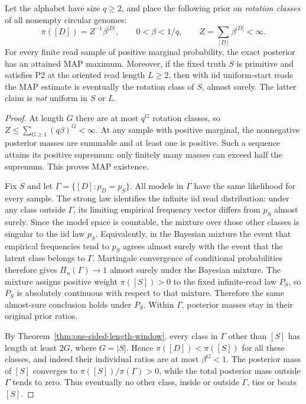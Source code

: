 \begin{proposition}
\label{prop:length-prior-map}
Let the alphabet have size $q\ge2$, and place the
following prior on \emph{rotation classes} of all nonempty
circular genomes:
\[
  \pi([D])=Z^{-1}\beta^{|D|},
  \qquad 0<\beta<1/q,\qquad
  Z=\sum_{[D]}\beta^{|D|}<\infty.
\]
For every finite read sample of positive marginal
probability, the exact posterior has an attained MAP
maximum. Moreover, if the fixed truth $S$ is primitive
and satisfies P2 at the oriented read length $L\ge2$,
then with iid uniform-start reads the MAP estimate is
eventually the rotation class of $S$, almost surely.
The latter claim is \emph{not} uniform in $S$ or $L$.
\end{proposition}
\begin{proof}
At length $G$ there are at most $q^G$ rotation classes,
so $Z\le\sum_{G\ge1}(q\beta)^G<\infty$.
At any sample with positive marginal, the nonnegative
posterior masses are summable and at least one is
positive. Such a sequence attains its positive
supremum: only finitely many masses can exceed
half the supremum. This proves MAP existence.

Fix $S$ and let $\Gamma=\{[D]:p_D=p_S\}$. All
models in $\Gamma$ have the same likelihood for
every sample. The strong law identifies the infinite
iid read distribution: under any class outside $\Gamma$,
its limiting empirical frequency vector differs
from $p_S$ almost surely. Since the model space is
countable, the mixture over those other classes
is singular to the iid law $p_S$. Equivalently, in
the Bayesian mixture the event
that empirical frequencies tend to $p_S$ agrees
almost surely with the event that the latent class
belongs to $\Gamma$. Martingale convergence of
conditional probabilities therefore gives
$\Pi_n(\Gamma)\to1$ almost surely under the Bayesian
mixture. The mixture assigns positive weight $\pi([S])>0$
to the fixed infinite-read law $P_S$, so $P_S$ is
absolutely continuous with respect to that mixture.
Therefore the same almost-sure conclusion holds under $P_S$.
Within $\Gamma$, posterior masses stay in their
original prior ratios.

By Theorem~\ref{thm:one-sided-length-window}, every
class in $\Gamma$ other than $[S]$ has length at
least $2G$, where $G=|S|$. Hence
$\pi([D])<\pi([S])$ for all these classes,
and indeed their individual ratios are at most
$\beta^G<1$. The posterior mass of $[S]$
converges to $\pi([S])/\pi(\Gamma)>0$, while
the total posterior mass outside $\Gamma$ tends
to zero. Thus eventually no other class, inside
or outside $\Gamma$, ties or beats $[S]$.
\end{proof}

